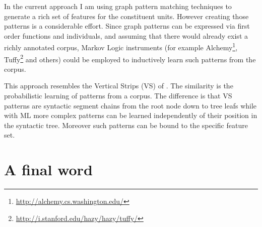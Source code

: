     In the current approach I am using graph pattern matching techniques to generate a rich set of features for the constituent units. However creating those patterns is a considerable effort. Since graph patterns can be expressed via first order functions and individuals, and assuming that there would already exist a richly annotated corpus, Markov Logic instruments (for example Alchemy\footnote{\url{http://alchemy.cs.washington.edu/}}, Tuffy\footnote{\url{http://i.stanford.edu/hazy/hazy/tuffy/}} and others) could be employed to inductively learn such patterns from the corpus. 

    This approach resembles the Vertical Strips (VS) of \citet{ODonoghue1991a}. The similarity is the probabilistic learning of patterns from a corpus. The difference is that VS patterns are syntactic segment chains from the root node down to tree leafs while with ML more complex patterns can be learned independently of their position in the syntactic tree. Moreover such patterns can be bound to the specific feature set. 

    
    
    \section{A final word}
